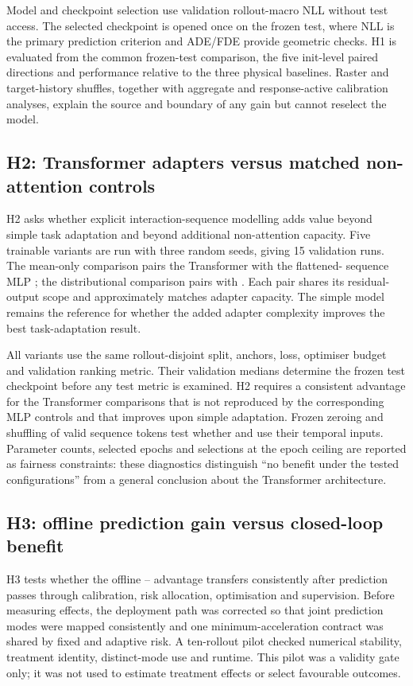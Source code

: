 Model and checkpoint selection use validation rollout-macro NLL without test
access. The selected checkpoint is opened once on the frozen test, where NLL
is the primary prediction criterion and ADE/FDE provide geometric checks. H1
is evaluated from the common frozen-test comparison, the five init-level
paired directions and performance relative to the three physical baselines.
Raster and target-history shuffles, together with aggregate and
response-active calibration analyses, explain the source and boundary of any
gain but cannot reselect the model.

\subsection{H2: Transformer adapters versus matched non-attention controls}

H2 asks whether explicit interaction-sequence modelling adds value beyond
simple task adaptation and beyond additional non-attention capacity. Five
trainable variants are run with three random seeds, giving 15 validation runs.
The mean-only comparison pairs the Transformer \Tone{} with the flattened-
sequence MLP \BtwoM{}; the distributional comparison pairs \Ttwo{} with
\BtwoD{}. Each pair shares its residual-output scope and approximately matches
adapter capacity. The simple \Bone{} model remains the reference for whether
the added adapter complexity improves the best task-adaptation result.

All variants use the same rollout-disjoint split, anchors, loss, optimiser
budget and validation ranking metric. Their validation medians determine the
frozen test checkpoint before any test metric is examined. H2 requires a
consistent advantage for the Transformer comparisons that is not reproduced
by the corresponding MLP controls and that improves upon simple adaptation.
Frozen zeroing and shuffling of valid sequence tokens test whether \Tone{} and
\Ttwo{} use their temporal inputs. Parameter counts, selected epochs and
selections at the epoch ceiling are reported as fairness constraints: these
diagnostics distinguish ``no benefit under the tested configurations'' from a
general conclusion about the Transformer architecture.

\subsection{H3: offline prediction gain versus closed-loop benefit}

H3 tests whether the offline \Bone{}--\Bzero{} advantage transfers
consistently after prediction passes through calibration, risk allocation,
optimisation and supervision. Before measuring effects, the deployment path
was corrected so that joint prediction modes were mapped consistently and one
minimum-acceleration contract was shared by fixed and adaptive risk. A
ten-rollout pilot checked numerical stability, treatment identity,
distinct-mode use and runtime. This pilot was a validity gate only; it was not
used to estimate treatment effects or select favourable outcomes.

